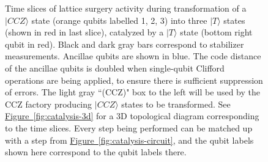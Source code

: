 \documentclass[twocolumn,accepted=2019-03-30]{quantumarticle}
\newcommand{\fig}[1]{\hyperref[fig:#1]{Figure~\ref*{fig:#1}}}
\begin{document}
\begin{figure}
    \label{fig:catalysis-slices}
    \centering
    \caption{
        Time slices of lattice surgery activity during transformation of a $|CCZ\rangle$ state (orange qubits labelled 1, 2, 3) into three $|T\rangle$ states (shown in red in last slice), catalyzed by a $|T\rangle$ state (bottom right qubit in red).
        Black and dark gray bars correspond to stabilizer measurements.
        Ancillae qubits are shown in blue.
        The code distance of the ancillae qubits is doubled when single-qubit Clifford operations are being applied, to ensure there is sufficient suppression of errors.
        The light gray ``(CCZ)" box to the left will be used by the CCZ factory producing $|CCZ\rangle$ states to be transformed.
        See \fig{catalysis-3d} for a 3D topological diagram corresponding to the time slices.
        Every step being performed can be matched up with a step from \fig{catalysis-circuit}, and the qubit labels shown here correspond to the qubit labels there.
    }
\end{figure}
\end{document}
